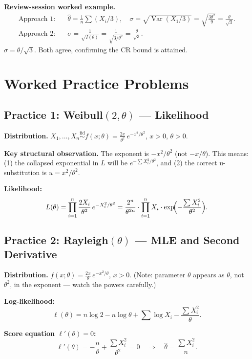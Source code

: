 \documentclass[11pt,a4paper]{article}
\newcommand{\iid}{\overset{\text{iid}}{\sim}}
\newcommand{\Var}{\operatorname{Var}}
\newcommand{\xn}{X_1, \ldots, X_n}
\begin{document}
\textbf{Review-session worked example.}
\begin{align*}
  \text{Approach 1:}\quad& \hat\theta = \tfrac{1}{n}\textstyle\sum (X_i/3),\quad \sigma = \sqrt{\Var(X_1/3)} = \sqrt{\tfrac{3\theta^2}{9}} = \frac{\theta}{\sqrt{3}}.\\[4pt]
  \text{Approach 2:}\quad& \sigma = \frac{1}{\sqrt{I(\theta)}} = \frac{1}{\sqrt{3/\theta^2}} = \frac{\theta}{\sqrt{3}}.
\end{align*}
$\boxed{\sigma = \theta/\sqrt{3}}$. Both agree, confirming the CR bound is attained.

\newpage
\section{Worked Practice Problems}

\subsection*{Practice 1: Weibull$(2,\theta)$ — Likelihood}

\textbf{Distribution.} $\xn \iid f(x;\theta) = \frac{2x}{\theta^2}\,e^{-x^2/\theta^2}$, $x>0$, $\theta>0$.

\textbf{Key structural observation.} The exponent is $-x^2/\theta^2$ (not $-x/\theta$). This means:
(1) the collapsed exponential in $L$ will be $e^{-\sum X_i^2/\theta^2}$, and
(2) the correct u-substitution is $u = x^2/\theta^2$.

\textbf{Likelihood:}
\[
  L(\theta) = \prod_{i=1}^n \frac{2X_i}{\theta^2}\,e^{-X_i^2/\theta^2}
  = \frac{2^n}{\theta^{2n}}\cdot\prod_{i=1}^n X_i\cdot\exp\!\Bigl(-\frac{\textstyle\sum X_i^2}{\theta^2}\Bigr).
\]

\subsection*{Practice 2: Rayleigh$(\theta)$ --- MLE and Second Derivative}

\textbf{Distribution.} $f(x;\theta) = \frac{2x}{\theta}\,e^{-x^2/\theta}$, $x>0$.
(Note: parameter $\theta$ appears as $\theta$, not $\theta^2$, in the exponent — watch the powers carefully.)

\textbf{Log-likelihood:}
\[
  \ell(\theta) = n\log 2 - n\log\theta + \sum\log X_i - \frac{\sum X_i^2}{\theta}.
\]

\textbf{Score equation $\ell'(\theta)=0$:}
\[
  \ell'(\theta) = -\frac{n}{\theta} + \frac{\sum X_i^2}{\theta^2} = 0
  \quad\Longrightarrow\quad \hat\theta = \frac{\sum X_i^2}{n}.
\]
\end{document}
